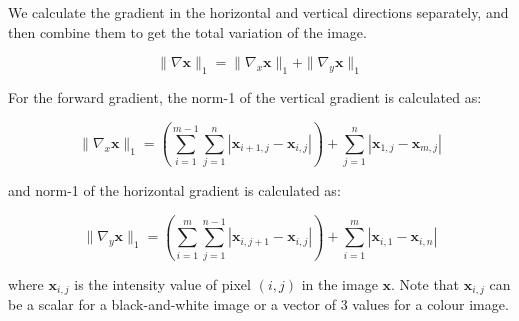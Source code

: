\documentclass[12pt]{article}
\begin{document}
We calculate the gradient in the horizontal and vertical directions separately, and then combine them to get the total variation of the image. 

\begin{equation}
  \| \nabla \mathbf{x} \|_1 = \| \nabla_x \mathbf{x} \|_1 + \| \nabla_y \mathbf{x} \|_1
\end{equation}




For the forward gradient, the norm-1 of the vertical gradient is calculated as:

\begin{equation}
  \| \nabla_x \mathbf{x} \|_1 = \left( \sum_{i=1}^{m-1} \sum_{j=1}^{n} |\mathbf{x}_{i+1,j} - \mathbf{x}_{i,j}| \right) + \sum_{j=1}^{n} |\mathbf{x}_{1, j} - \mathbf{x}_{m,j}|
\end{equation}

and norm-1 of the horizontal gradient is calculated as:

\begin{equation}
  \| \nabla_y \mathbf{x} \|_1 = \left( \sum_{i=1}^{m} \sum_{j=1}^{n-1} |\mathbf{x}_{i,j+1} - \mathbf{x}_{i,j}| \right) + \sum_{i=1}^{m} |\mathbf{x}_{i, 1} - \mathbf{x}_{i,n}|
\end{equation}




where $\mathbf{x}_{i,j}$ is the intensity value of pixel $(i,j)$ in the image $\mathbf{x}$. Note that $\mathbf{x}_{i,j}$ can be a scalar for a black-and-white image or a vector of 3 values for a colour image.
\end{document}
